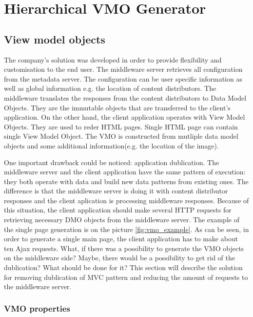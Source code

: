 \section{Hierarchical VMO Generator}

\subsection{View model objects}

The company's solution was developed in order to provide flexibility and customisation to the end user. The middleware server retrieves all configuration from the metadata server. The configuration can be user specific information as well as global information e.g. the location of content distributors. The middleware translates the responses from the content distributors to Data Model Objects. They are the immutable objects that are transferred to the client's application. On the other hand, the client application operates with View Model Objects. They are used to reder HTML pages. Single HTML page can contain single View Model Object. The VMO is constructed from mutliple data model objects and some additional information(e.g. the location of the image).   

One important drawback could be noticed: application dublication. The middleware server and the client application have the same pattern of execution: they both operate with data and build new data patterns from existing ones. The difference is that the middleware server is doing it with content distributor responses and the client aplication is processing middleware responses. Because of this situation, the client application should make several HTTP requests for retrieving necessary DMO objects from the middleware server.  The example of the single page generation is on the picture \ref{fig:vmo_example}. As can be seen, in order to generate a single main page, the client application has to make about ten Ajax requests. What, if there was a possibility to generate the VMO objects on the middleware side?  Maybe, there would be a possibility to get rid of the dublication? What should be done for it? This section will describe the solution for removing dublication of MVC pattern and reducing the amount of requests to the middleware server. 

\subsubsection{VMO properties}

